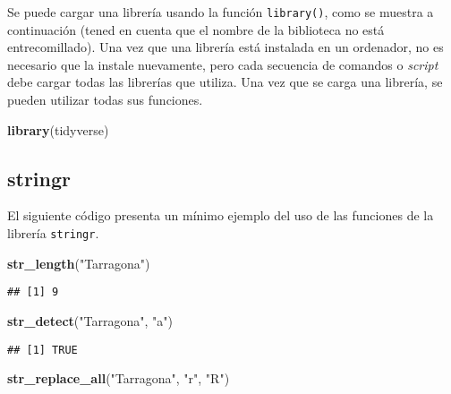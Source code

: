 \documentclass[
]{book}
\newenvironment{Shaded}{\begin{snugshade}}{\end{snugshade}}
\newcommand{\KeywordTok}[1]{\textcolor[rgb]{0.13,0.29,0.53}{\textbf{#1}}}
\newcommand{\NormalTok}[1]{#1}
\newcommand{\StringTok}[1]{\textcolor[rgb]{0.31,0.60,0.02}{#1}}
\begin{document}
Se puede cargar una librería usando la función \texttt{library()}, como se muestra a continuación (tened en cuenta que el nombre de la biblioteca no está entrecomillado). Una vez que una librería está instalada en un ordenador, no es necesario que la instale nuevamente, pero cada secuencia de comandos o \emph{script} debe cargar todas las librerías que utiliza. Una vez que se carga una librería, se pueden utilizar todas sus funciones.

\begin{Shaded}
\begin{Highlighting}[]
\KeywordTok{library}\NormalTok{(tidyverse)}
\end{Highlighting}
\end{Shaded}

\hypertarget{stringr}{%
\subsection{stringr}\label{stringr}}

El siguiente código presenta un mínimo ejemplo del uso de las funciones de la librería \texttt{stringr}.

\begin{Shaded}
\begin{Highlighting}[]
\KeywordTok{str_length}\NormalTok{(}\StringTok{"Tarragona"}\NormalTok{)}
\end{Highlighting}
\end{Shaded}

\begin{verbatim}
## [1] 9
\end{verbatim}

\begin{Shaded}
\begin{Highlighting}[]
\KeywordTok{str_detect}\NormalTok{(}\StringTok{"Tarragona"}\NormalTok{, }\StringTok{"a"}\NormalTok{)}
\end{Highlighting}
\end{Shaded}

\begin{verbatim}
## [1] TRUE
\end{verbatim}

\begin{Shaded}
\begin{Highlighting}[]
\KeywordTok{str_replace_all}\NormalTok{(}\StringTok{"Tarragona"}\NormalTok{, }\StringTok{"r"}\NormalTok{, }\StringTok{"R"}\NormalTok{)}
\end{Highlighting}
\end{Shaded}
\end{document}
